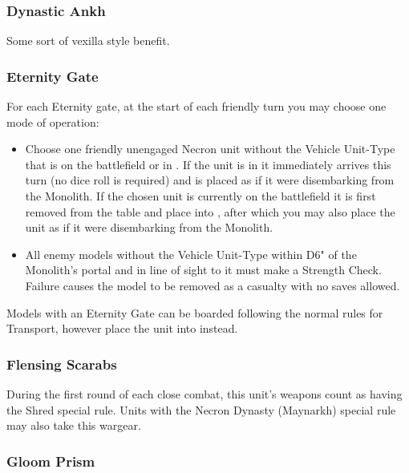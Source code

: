 \subsubsection{Dynastic Ankh} \label{Dynastic Ankh}

Some sort of vexilla style benefit.

\subsubsection{Eternity Gate} \label{Eternity Gate}

For each Eternity gate, at the start of each friendly turn you may choose one mode of operation:

\begin{itemize}
	\item Choose one friendly unengaged Necron unit without the Vehicle Unit-Type that is on the battlefield or in . If the unit is in  it immediately arrives this turn (no dice roll is required) and is placed as if it were disembarking from the Monolith. If the chosen unit is currently on the battlefield it is first removed from the table and place into , after which you may also place the unit as if it were disembarking from the Monolith.
	\item All enemy models without the Vehicle Unit-Type within D6" of the Monolith's portal and in line of sight to it must make a Strength Check. Failure causes the model to be removed as a casualty with no saves allowed.
\end{itemize}

Models with an Eternity Gate can be boarded following the normal rules for Transport, however place the unit into  instead.


\subsubsection{Flensing Scarabs} \label{Flensing Scarabs}

During the first round of each close combat, this unit's weapons count as having the Shred special rule. Units with the Necron Dynasty (Maynarkh) special rule may also take this wargear.

\subsubsection{Gloom Prism} \label{Gloom Prism}

